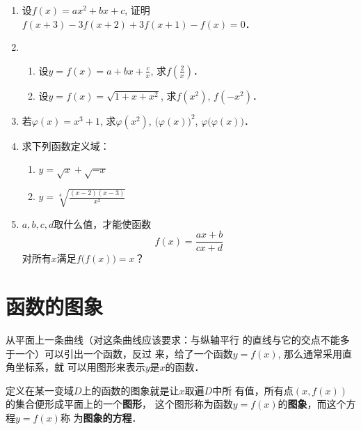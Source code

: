 \begin{enumerate}
\item 设$f(x)=ax^2+bx+c$, 证明
$f(x+3)-3f(x+2)+3f(x+1)-f(x)=0$．
\item \begin{enumerate}
\item 设$y=f(x)=a+bx+\frac{c}{x}$, 求$f\left(\frac{2}{x}\right)$．
\item 设$y=f(x)=\sqrt{1+x+x^2}$, 求$f(x^2)$, $f(-x^2)$．
\end{enumerate}

\item 若$\varphi(x)=x^3+1$, 求$\varphi(x^2)$, $\big(\varphi(x)\big)^2$, $\varphi\big(\varphi(x)\big)$．
\item 求下列函数定义域：
\begin{multicols}{2}
 \begin{enumerate}
    \item $y=\sqrt{x}+\sqrt{-x}$
    \item $y=\sqrt[4]{\frac{(x-2)(x-3)}{x^2}}$
\end{enumerate}   
\end{multicols}

\item $a,b,c,d$取什么值，才能使函数$$f(x)=\frac{ax+b}{cx+d}$$对所有$x$满足$f\big(f(x)\big)=x$？
\end{enumerate}

\section{函数的图象}

从平面上一条曲线（对这条曲线应该要求：与纵轴平行
的直线与它的交点不能多于一个）可以引出一个函数，反过
来，给了一个函数$y=f(x)$, 那么通常采用直角坐标系，就
可以用图形来表示$y$是$x$的函数．

定义在某一变域$D$上的函数的图象就是让$x$取遍$D$中所
有值，所有点$(x,f(x))$的集合便形成平面上的一个\textbf{图形}，
这个图形称为函数$y=f(x)$的\textbf{图象}，而这个方程$y=f(x)$称
为\textbf{图象的方程}．

